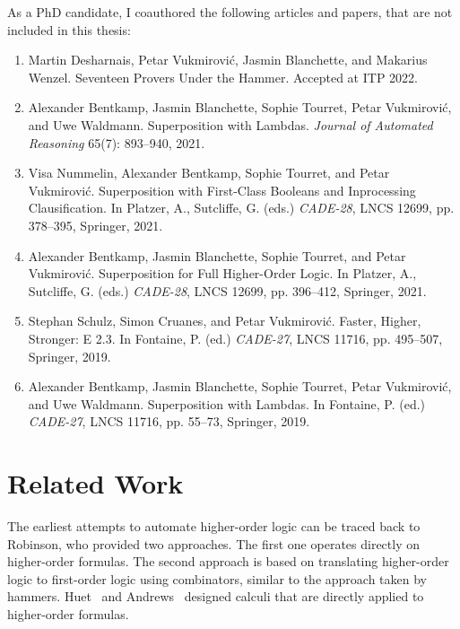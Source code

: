 As a PhD candidate, I coauthored the following articles and papers, that are not included in this thesis:

\begin{enumerate}[resume]
  \item Martin Desharnais, Petar Vukmirović, Jasmin Blanchette, and Makarius Wenzel. Seventeen Provers Under the Hammer.
  Accepted at ITP 2022.
  \item Alexander Bentkamp, Jasmin Blanchette, Sophie Tourret, Petar Vukmirović, and Uwe Waldmann.  Superposition with Lambdas.
  \emph{Journal of Automated Reasoning} 65(7): 893--940, 2021. 
  \item Visa Nummelin, Alexander Bentkamp, Sophie Tourret, and Petar Vukmirović. Superposition with First-Class Booleans and Inprocessing Clausification.
  In Platzer, A., Sutcliffe, G. (eds.) \emph{CADE-28}, LNCS 12699, pp. 378--395, Springer, 2021.
  \item Alexander Bentkamp, Jasmin Blanchette, Sophie Tourret, and Petar Vukmirović. Superposition for Full Higher-Order Logic.
  In Platzer, A., Sutcliffe, G. (eds.) \emph{CADE-28}, LNCS 12699, pp. 396--412, Springer, 2021.
  \item Stephan Schulz, Simon Cruanes, and Petar Vukmirović. Faster, Higher, Stronger: E 2.3.
  In Fontaine, P. (ed.) \emph{CADE-27},  LNCS 11716, pp. 495--507, Springer, 2019.
  \item Alexander Bentkamp, Jasmin Blanchette, Sophie Tourret, Petar Vukmirović, and Uwe Waldmann.  Superposition with Lambdas.
  In Fontaine, P. (ed.) \emph{CADE-27}, LNCS 11716, pp. 55--73, Springer, 2019. 
\end{enumerate}

\section{Related Work}

The earliest attempts to automate higher-order logic can be traced back to
Robinson, who provided two approaches. The first one \cite{ar-69-hol} operates
directly on higher-order formulas. The second approach \cite{ar-70-hol} is based
on translating higher-order logic to first-order logic using combinators,
similar to the approach taken by hammers. Huet~\cite{gh-73-hol} and
Andrews~\cite{pa-71-type-theory} designed calculi that are directly applied to
higher-order formulas.

